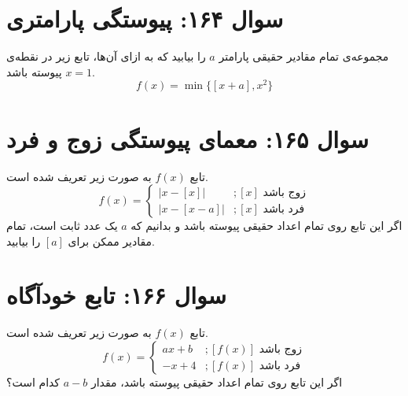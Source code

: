 \documentclass[12pt]{article}
\begin{document}
\section*{سوال ۱۶۴: پیوستگی پارامتری}
مجموعه‌ی تمام مقادیر حقیقی پارامتر \(a\) را بیابید که به ازای آن‌ها، تابع زیر در نقطه‌ی \(x=1\) پیوسته باشد.
\begin{displaymath}
	f(x) = \min\{[x+a], x^2\}
\end{displaymath}

\vspace{1cm}
\hrulefill
\vspace{1cm}

\section*{سوال ۱۶۵: معمای پیوستگی زوج و فرد}
تابع \(f(x)\) به صورت زیر تعریف شده است.
\begin{displaymath}
	f(x) = 
	\begin{cases}
		|x - [x]| & ;  [x] \text{ زوج باشد} \\
		|x - [x-a]| & ;  [x] \text{ فرد باشد}
	\end{cases}
\end{displaymath}
اگر این تابع روی تمام اعداد حقیقی پیوسته باشد و بدانیم که \(a\) یک عدد ثابت است، تمام مقادیر ممکن برای \( [a] \) را بیابید.

\vspace{1cm}
\hrulefill
\vspace{1cm}

\section*{سوال ۱۶۶: تابع خودآگاه}
تابع \(f(x)\) به صورت زیر تعریف شده است.
\begin{displaymath}
	f(x) = 
	\begin{cases}
		ax+b & ;  [f(x)] \text{ زوج باشد} \\
		-x+4 & ;  [f(x)] \text{ فرد باشد}
	\end{cases}
\end{displaymath}
اگر این تابع روی تمام اعداد حقیقی پیوسته باشد، مقدار \( a-b \) کدام است؟
\end{document}
